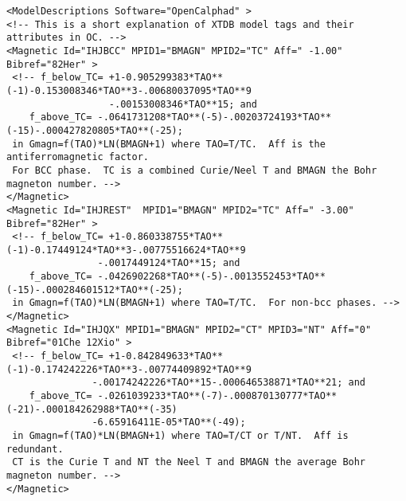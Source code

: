 \documentclass[preprint,review,12pt]{elsarticle}
\begin{document}
\begin{appendix}
{\small
\begin{verbatim}
<ModelDescriptions Software="OpenCalphad" >
<!-- This is a short explanation of XTDB model tags and their attributes in OC. -->
<Magnetic Id="IHJBCC" MPID1="BMAGN" MPID2="TC" Aff=" -1.00" Bibref="82Her" > 
 <!-- f_below_TC= +1-0.905299383*TAO**(-1)-0.153008346*TAO**3-.00680037095*TAO**9
                  -.00153008346*TAO**15; and
    f_above_TC= -.0641731208*TAO**(-5)-.00203724193*TAO**(-15)-.000427820805*TAO**(-25); 
 in Gmagn=f(TAO)*LN(BMAGN+1) where TAO=T/TC.  Aff is the antiferromagnetic factor.
 For BCC phase.  TC is a combined Curie/Neel T and BMAGN the Bohr magneton number. -->
</Magnetic>
<Magnetic Id="IHJREST"  MPID1="BMAGN" MPID2="TC" Aff=" -3.00" Bibref="82Her" > 
 <!-- f_below_TC= +1-0.860338755*TAO**(-1)-0.17449124*TAO**3-.00775516624*TAO**9
                -.0017449124*TAO**15; and 
    f_above_TC= -.0426902268*TAO**(-5)-.0013552453*TAO**(-15)-.000284601512*TAO**(-25); 
 in Gmagn=f(TAO)*LN(BMAGN+1) where TAO=T/TC.  For non-bcc phases. -->
</Magnetic>
<Magnetic Id="IHJQX" MPID1="BMAGN" MPID2="CT" MPID3="NT" Aff="0" Bibref="01Che 12Xio" > 
 <!-- f_below_TC= +1-0.842849633*TAO**(-1)-0.174242226*TAO**3-.00774409892*TAO**9
               -.00174242226*TAO**15-.000646538871*TAO**21; and
    f_above_TC= -.0261039233*TAO**(-7)-.000870130777*TAO**(-21)-.000184262988*TAO**(-35)
               -6.65916411E-05*TAO**(-49);
 in Gmagn=f(TAO)*LN(BMAGN+1) where TAO=T/CT or T/NT.  Aff is redundant.
 CT is the Curie T and NT the Neel T and BMAGN the average Bohr magneton number. -->
</Magnetic>
\end{verbatim}
}

\newpage


\end{appendix}
\end{document}
